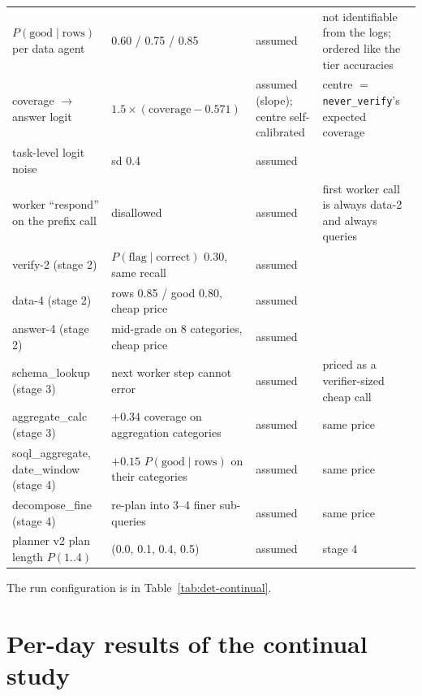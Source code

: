 \documentclass[10pt]{article}
\newcommand{\code}[1]{\texttt{#1}}
\begin{document}
\begin{table}[H]
\begin{tabular}{p{4.2cm}p{3.6cm}p{1.9cm}p{4.9cm}}
\midrule
$P(\text{good}\mid\text{rows})$ per data agent & 0.60 / 0.75 / 0.85 & assumed & not identifiable from the logs; ordered like the tier accuracies \\
coverage $\to$ answer logit & $1.5\times(\text{coverage}-0.571)$ & assumed (slope); centre self-calibrated & centre $=$ \code{never\_verify}'s expected coverage \\
task-level logit noise & sd 0.4 & assumed & \\
worker ``respond'' on the prefix call & disallowed & assumed & first worker call is always data-2 and always queries \\
verify-2 (stage 2) & $P(\text{flag}\mid\text{correct})$ 0.30, same recall & assumed & \\
data-4 (stage 2) & rows 0.85 / good 0.80, cheap price & assumed & \\
answer-4 (stage 2) & mid-grade on 8 categories, cheap price & assumed & \\
schema\_lookup (stage 3) & next worker step cannot error & assumed & priced as a verifier-sized cheap call \\
aggregate\_calc (stage 3) & $+0.34$ coverage on aggregation categories & assumed & same price \\
soql\_aggregate, date\_window (stage 4) & $+0.15$ $P(\text{good}\mid\text{rows})$ on their categories & assumed & same price \\
decompose\_fine (stage 4) & re-plan into 3--4 finer sub-queries & assumed & same price \\
planner v2 plan length $P(1..4)$ & (0.0, 0.1, 0.4, 0.5) & assumed & stage 4 \\
\bottomrule
\end{tabular}
\end{table}

The run configuration is in Table~\ref{tab:det-continual}.

\section{Per-day results of the continual study}
\label{app:days}

\begin{table}[H]
\centering\scriptsize
\caption{The continual (cgrpo) arm day by day, generated from \code{days.jsonl} and \code{gates.jsonl}. $^*$ marks an event day. Served quality is the simulator's expected quality; $\bar\lambda$ is the served policy's learned price; ESS is the per-decision effective sample size over logged decisions; ``truth'' is whether the candidate was acceptable on the simulator.}
\setlength{\tabcolsep}{3pt}

\end{table}
\end{document}
